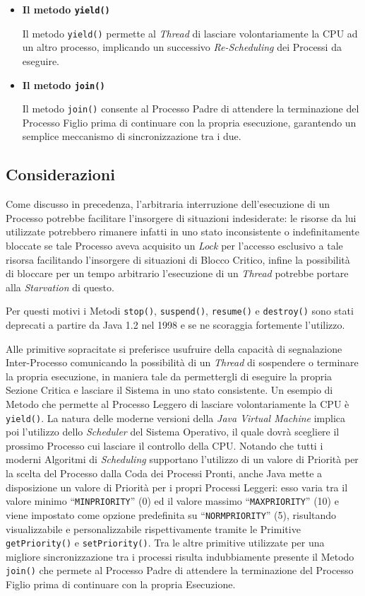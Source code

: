\begin{itemize}
    \item \textbf{Il metodo \texttt{yield()}} \par
    Il metodo \texttt{yield()} permette al \textit{Thread} di lasciare volontariamente la CPU ad un altro processo, implicando un successivo \textit{Re-Scheduling} dei Processi da eseguire.
    \item \textbf{Il metodo \texttt{join()}} \par
    Il metodo \texttt{join()} consente al Processo Padre di attendere la terminazione del Processo Figlio prima di continuare con la propria esecuzione, garantendo un semplice meccanismo di sincronizzazione tra i due.
\end{itemize}

\subsection{Considerazioni}
Come discusso in precedenza, l'arbitraria interruzione dell'esecuzione di un Processo potrebbe facilitare l'insorgere di situazioni indesiderate: le risorse da lui utilizzate potrebbero rimanere infatti in uno stato inconsistente o indefinitamente bloccate se tale Processo aveva acquisito un \textit{Lock} per l'accesso esclusivo a tale risorsa facilitando l'insorgere di situazioni di Blocco Critico, infine la possibilità di bloccare per un tempo arbitrario l'esecuzione di un \textit{Thread} potrebbe portare alla \textit{Starvation} di questo. \par
Per questi motivi i Metodi \texttt{stop()}, \texttt{suspend()}, \texttt{resume()} e \texttt{destroy()} sono stati deprecati a partire da Java 1.2 nel 1998 e se ne scoraggia fortemente l'utilizzo. \par
Alle primitive sopracitate si preferisce usufruire della capacità di segnalazione Inter-Processo comunicando la possibilità di un \textit{Thread} di sospendere o terminare la propria esecuzione, in maniera tale da permettergli di eseguire la propria Sezione Critica e lasciare il Sistema in uno stato consistente. Un esempio di Metodo che permette al Processo Leggero di lasciare volontariamente la CPU è \texttt{yield()}. La natura delle moderne versioni della \textit{Java Virtual Machine} implica poi l'utilizzo dello \textit{Scheduler} del Sistema Operativo, il quale dovrà scegliere il prossimo Processo cui lasciare il controllo della CPU. Notando che tutti i moderni Algoritmi di \textit{Scheduling} supportano l'utilizzo di un valore di Priorità per la scelta del Processo dalla Coda dei Processi Pronti, anche Java mette a disposizione un valore di Priorità per i propri Processi Leggeri: esso varia tra il valore minimo ``\texttt{MIN\textunderscore PRIORITY}'' (0) ed il valore massimo ``\texttt{MAX\textunderscore PRIORITY}'' (10) e viene impostato come opzione predefinita su ``\texttt{NORM\textunderscore PRIORITY}'' (5), risultando visualizzabile e personalizzabile rispettivamente tramite le Primitive \texttt{getPriority()} e \texttt{setPriority()}. Tra le altre primitive utilizzate per una migliore sincronizzazione tra i processi risulta indubbiamente presente il Metodo \texttt{join()} che permete al Processo Padre di attendere la terminazione del Processo Figlio prima di continuare con la propria Esecuzione.
